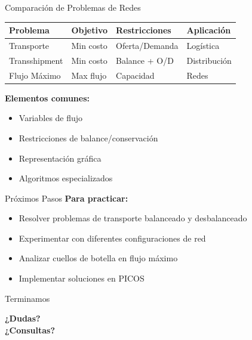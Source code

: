 \documentclass{beamer}
\begin{document}
\begin{frame}{Comparación de Problemas de Redes}
    \begin{table}[H]
        \centering
        \begin{tabular}{l|l|l|l}
            \toprule
            \textbf{Problema} & \textbf{Objetivo} & \textbf{Restricciones} & \textbf{Aplicación} \\
            \midrule
            Transporte & Min costo & Oferta/Demanda & Logística \\
            Transshipment & Min costo & Balance + O/D & Distribución \\
            Flujo Máximo & Max flujo & Capacidad & Redes \\
            \bottomrule
        \end{tabular}
    \end{table}
    
    \vspace{1em}
    \textbf{Elementos comunes:}
    \begin{itemize}
        \item Variables de flujo
        \item Restricciones de balance/conservación
        \item Representación gráfica
        \item Algoritmos especializados
    \end{itemize}
\end{frame}

\begin{frame}{Próximos Pasos}
    \textbf{Para practicar:}
    \begin{itemize}
        \item Resolver problemas de transporte balanceado y desbalanceado
        \item Experimentar con diferentes configuraciones de red
        \item Analizar cuellos de botella en flujo máximo
        \item Implementar soluciones en PICOS
    \end{itemize}
\end{frame}

\begin{frame}{Terminamos}
    \begin{center}
        \Large{\textbf{¿Dudas?\\¿Consultas?}}
    \end{center}
\end{frame}
\end{document}
